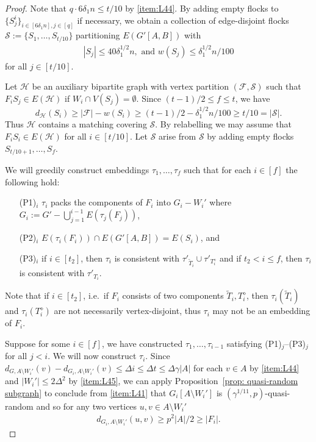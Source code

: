 \documentclass[a4paper, 11pt, reqno]{amsart}
\numberwithin{equation}{section}
\newcommand{\1}{{\rm 1\hspace*{-0.4ex}%
\rule{0.1ex}{1.52ex}\hspace*{0.2ex}}}
\newcommand{\es}{\emptyset}
\newcommand{\cS}{\mathcal{S}}
\newcommand{\cF}{\mathcal{F}}
\newcommand{\cH}{\mathcal{H}}
\newcommand{\sm}{\setminus}
\begin{document}
\begin{proof}
Note that $q\cdot 6\delta_1 n \leq t/10$ by \ref{item:L44}. By adding empty flocks to $\{S_j^i\}_{i\in [6\delta_1 n],j\in [q]}$ if necessary,
we obtain a collection of edge-disjoint flocks $\cS:=\{S_1,\dots, S_{t/10}\}$ partitioning $E(G'[A,B])$ with
\begin{align}\label{eq:seagulls}
|S_j|\leq 40\delta_1^{1/2} n, \text{ and } w(S_j) \leq \delta_1^{1/2}n/100
\end{align}
for all $j\in [t/10]$.


Let $\cH$ be an auxiliary bipartite graph with vertex partition $(\cF, \cS)$ 
such that $F_iS_j \in E(\cH)$ if $W_i \cap V(S_j)=\es$. 
Since $(t-1)/2 \leq f \leq t$, we have
$$d_{\cH}(S_i) \geq |\cF| - w(S_i) \geq (t-1)/2 - \delta_1^{1/2}n/100 \geq t/10 =  |\cS|.$$ 
Thus $\cH$ contains a matching covering $\cS$. 
By relabelling we may assume that $F_iS_i\in E(\cH)$ for all $i\in [t/10]$. 
Let $\hat{\cS}$ arise from $\cS$ by adding empty flocks $S_{t/10+1},\dots, S_{f}$.

We will greedily construct embeddings $\tau_1,\dots, \tau_f$ such that for each $i\in [f]$ the following hold:
\begin{itemize}
\item[(P1)$_i$] $\tau_i$ packs the components of $F_i$ into $G_i-W_i'$ where $G_i:= G'-\bigcup_{j=1}^{i-1} E(\tau_j(F_j))$,
\item[(P2)$_i$] $E(\tau_i(F_i))\cap E(G'[A,B])= E(S_i)$, and
\item[(P3)$_i$] if $i\in [t_2]$, then $\tau_i$ is consistent with $\tau'_{\tilde{T}_i} \cup \tau'_{T^{\diamond}_i}$ and 
if $t_2<i\leq f$, then $\tau_i$ is consistent with $\tau'_{T_i}$.
\end{itemize}
Note that 
if $i\in[t_2]$, i.e.~if $F_i$ consists of two components $\tilde{T}_i,T_i^\diamond$, 
then $\tau_i(\tilde{T}_i)$ and $\tau_{i}(T_i^\diamond)$ are not necessarily vertex-disjoint, 
thus $\tau_i$ may not be an embedding of $F_i$. 

Suppose for some $i\in [f]$, we have constructed $\tau_1,\dots, \tau_{i-1}$ satisfying (P1)$_j$--(P3)$_j$ for all $j<i$.
We will now construct $\tau_i$.
Since $d_{G, A\sm W_i'}(v)-d_{G_i, A\sm W_i'}(v) \leq \Delta i \leq \Delta t \leq \Delta \gamma |A|$ for each $v\in A$ by \ref{item:L44} 
and $|W_i'|\leq 2\Delta^2$ by \ref{item:L45},
we can apply Proposition~\ref{prop: quasi-random subgraph} to conclude from \ref{item:L41} that $G_i[A\sm W_i']$ is $(\gamma^{1/11},p)$-quasi-random
and so for any two vertices $u,v\in A\sm W_i'$
\begin{align}\label{eq:Giquasirandom}
	d_{G_i,A\sm W_i'}(u,v)\geq p^2 |A|/2 \geq |F_i|.
\end{align}



\end{proof}
\end{document}
